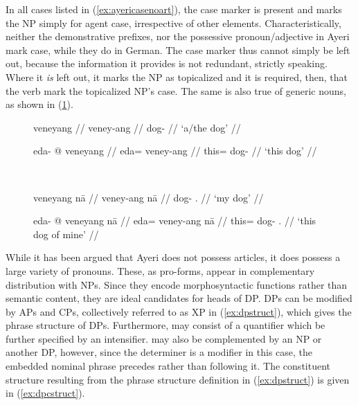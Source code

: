 In all cases listed in (\ref{ex:ayericasenoart}), the case marker is present
and marks the NP simply for agent case, irrespective of other elements.
Characteristically, neither the demonstrative prefixes, nor the possessive
pronoun/adjective in Ayeri mark case, while they do in German. The case marker
thus cannot simply be left out, because the information it provides is not
redundant, strictly speaking. Where it \emph{is} left out, it marks the NP as
topicalized and it is required, then, that the verb mark the topicalized NP's
case. The same is also true of generic nouns, as shown in
(\ref{ex:suffixcase}).

\begin{figure}[h]
\ex{}\label{ex:suffixcase}%
\begin{minipage}[t]{.5\remaining}%
	\tl\quad\begingl
		\gla veneyang //
		\glb veney-ang //
		\glc dog-\Aarg{} //
		\glft `a/the dog' //
	\endgl\medskip

	\tl\quad\begingl
		\gla eda- @ veneyang //
		\glb eda= veney-ang //
		\glc this= dog-\Aarg{} //
		\glft `this dog' //
	\endgl
\end{minipage}
~
\begin{minipage}[t]{.5\remaining}%
	\tl\quad\begingl
		\gla veneyang nā //
		\glb veney-ang nā //
		\glc dog-\Aarg{} \Fsg{}.\Gen{} //
		\glft `my dog' //
	\endgl\medskip

	\tl\quad\begingl
		\gla eda- @ veneyang nā //
		\glb eda= veney-ang nā //
		\glc this= dog-\Aarg{} \Fsg{}.\Gen{} //
		\glft `this dog of mine' //
	\endgl
\end{minipage}
\xe
\end{figure}


While it has been argued that Ayeri does not possess articles, it does possess
a large variety of pronouns. These, as pro-forms, appear in complementary
distribution with NPs. Since they encode morphosyntactic functions rather than
semantic content, they are ideal candidates for heads of DP. DPs can be
modified by APs and CPs, collectively referred to as XP in (\ref{ex:dpstruct}),
which gives the phrase structure of DPs. Furthermore,  may consist of
a quantifier which  be further specified by an intensifier.  may also
be complemented by an NP or another DP, however, since the determiner is a
modifier in this case, the embedded nominal phrase precedes  rather
than following it. The constituent structure resulting from the phrase
structure definition in (\ref{ex:dpstruct}) is given in (\ref{ex:dpcstruct}).

